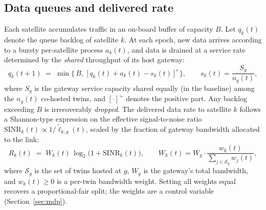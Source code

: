 \documentclass[11pt]{article}
\begin{document}
\subsection{Data queues and delivered rate}
Each satellite accumulates traffic in an on-board buffer of capacity $B$. Let
$q_k(t)$ denote the queue backlog of satellite $k$. At each epoch, new data arrives
according to a bursty per-satellite process $a_k(t)$, and data is drained at a
service rate determined by the \emph{shared} throughput of its host gateway:
\begin{equation}
  q_k(t{+}1) \;=\; \min\!\Big\{\, B,\; \big[\, q_k(t) + a_k(t) - s_k(t) \,\big]^+ \Big\},
  \qquad
  s_k(t) = \frac{S_g}{n_g(t)},
  \label{eq:queue}
\end{equation}
where $S_g$ is the gateway service capacity shared equally (in the baseline) among
the $n_g(t)$ co-hosted twins, and $[\cdot]^+$ denotes the positive part. Any
backlog exceeding $B$ is irrecoverably \emph{dropped}. The delivered data rate to
satellite $k$ follows a Shannon-type expression on the effective signal-to-noise
ratio $\mathrm{SINR}_k(t) \propto 1/\tilde{\ell}_{k,g}(t)$, scaled by the fraction
of gateway bandwidth allocated to the link:
\begin{equation}
  R_k(t) \;=\; W_{k}(t)\,\log_2\!\big(1 + \mathrm{SINR}_k(t)\big),
  \qquad
  W_k(t) = W_g \cdot \frac{w_k(t)}{\sum_{j \in \mathcal{S}_g} w_j(t)},
  \label{eq:rate}
\end{equation}
where $\mathcal{S}_g$ is the set of twins hosted at $g$, $W_g$ is the gateway's
total bandwidth, and $w_k(t) \ge 0$ is a per-twin bandwidth weight. Setting all
weights equal recovers a proportional-fair split; the weights are a control
variable (Section~\ref{sec:mdp}).
\end{document}
